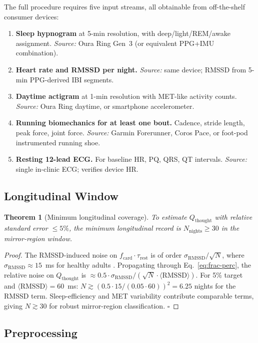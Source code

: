 \documentclass[11pt,twocolumn,a4paper]{article}
\newtheorem{theorem}{Theorem}[section]
\theoremstyle{definition}
\theoremstyle{remark}
\newcommand{\Qth}{Q_{\mathrm{thought}}}
\newcommand{\fcard}{f_{\mathrm{card}}}
\newcommand{\taurest}{\tau_{\mathrm{rest}}}
\newcommand{\RMSSD}{\mathrm{RMSSD}}
\begin{document}
The full procedure requires five input streams, all obtainable from
off-the-shelf consumer devices:
\begin{enumerate}[leftmargin=1.3em]
  \item \textbf{Sleep hypnogram} at 5-min resolution, with
  deep/light/REM/awake assignment. \emph{Source:} Oura Ring Gen~3
  (or equivalent PPG+IMU combination).
  \item \textbf{Heart rate and RMSSD per night.} \emph{Source:} same
  device; RMSSD from 5-min PPG-derived IBI segments.
  \item \textbf{Daytime actigram} at 1-min resolution with MET-like
  activity counts. \emph{Source:} Oura Ring daytime, or smartphone
  accelerometer.
  \item \textbf{Running biomechanics for at least one bout.}
  Cadence, stride length, peak force, joint force.
  \emph{Source:} Garmin Forerunner, Coros Pace, or foot-pod
  instrumented running shoe.
  \item \textbf{Resting 12-lead ECG.} For baseline HR, PQ, QRS, QT
  intervals. \emph{Source:} single in-clinic ECG; verifies device
  HR.
\end{enumerate}

\subsection{Longitudinal Window}

\begin{theorem}[Minimum longitudinal coverage]
\label{thm:minlength}
To estimate $\Qth$ with relative standard error $\le 5\%$, the
minimum longitudinal record is $N_{\mathrm{nights}}\ge 30$ in the
mirror-region window.
\end{theorem}

\begin{proof}
The RMSSD-induced noise on $\fcard\cdot\taurest$ is of order
$\sigma_{\RMSSD}/\sqrt{N}$, where $\sigma_{\RMSSD}\approx 15$~ms for
healthy adults \citep{shaffer2017}. Propagating through
Eq.~\eqref{eq:frac-perc}, the relative noise on $\Qth$ is
$\approx 0.5\cdot\sigma_{\RMSSD}/(\sqrt{N}\cdot \langle\RMSSD\rangle)$.
For 5\% target and $\langle\RMSSD\rangle=60$~ms:
$N\gtrsim (0.5\cdot 15/(0.05\cdot 60))^2 = 6.25$ nights for the
RMSSD term. Sleep-efficiency and MET variability contribute
comparable terms, giving $N\gtrsim 30$ for robust mirror-region
classification. $\square$
\end{proof}

\subsection{Preprocessing}
\end{document}
